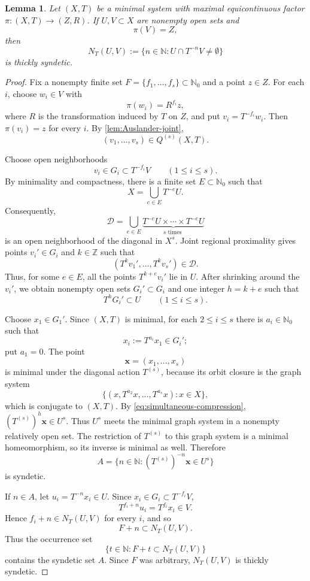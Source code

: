 \documentclass[reqno,12pt]{amsart}
\newtheorem{lemma}[thm]{Lemma}
\newcommand{\Nzero}{\mathbb N_0}
\def \N {\mathbb N}
\def \Z {\mathbb Z}
\numberwithin{equation}{section}
\begin{document}
\begin{lemma}\label{lem:full-fibre-returns}
Let $(X,T)$ be a minimal system with maximal equicontinuous
factor $\pi:(X,T)\to (Z,R)$. If $U,V\subset X$ are nonempty open sets and
\[
 \pi(V)=Z,
\]
then
\[
 N_T(U,V):=\{n\in\N:U\cap T^{-n}V\neq\emptyset\}
\]
is thickly syndetic.
\end{lemma}

\begin{proof}
Fix a nonempty finite set
$F=\{f_1,\ldots,f_s\}\subset\Nzero$ and a point $z\in Z$.
For each $i$, choose $w_i\in V$ with
\[
 \pi(w_i)=R^{f_i}z,
\]
where $R$ is the transformation induced by $T$ on $Z$, and put
$v_i=T^{-f_i}w_i$. Then $\pi(v_i)=z$ for every $i$.
By \cref{lem:Auslander-joint},
\[
 (v_1,\ldots,v_s)\in Q^{(s)}(X,T).
\]

Choose open neighborhoods
\[
 v_i\in G_i\subset T^{-f_i}V\qquad(1\leq i\leq s).
\]
By minimality and compactness, there is a finite set $E\subset\Nzero$ such
that
\[
 X=\bigcup_{e\in E}T^{-e}U.
\]
Consequently,
\[
 \mathcal D=\bigcup_{e\in E}\underbrace{T^{-e}U\times\cdots\times T^{-e}U}_{s\text{ times }}
\]
is an open neighborhood of the diagonal in $X^s$. Joint regional
proximality gives points $v_i'\in G_i$ and $k\in\Z$ such that
\[
 (T^kv_1',\ldots,T^kv_s')\in\mathcal D.
\]
Thus, for some $e\in E$, all the points $T^{k+e}v_i'$ lie in $U$.
After shrinking around the $v_i'$, we obtain nonempty open sets
$G_i'\subset G_i$ and one integer $h=k+e$ such that
\begin{equation}\label{eq:simultaneous-compression}
 T^hG_i'\subset U\qquad(1\leq i\leq s).
\end{equation}

Choose $x_1\in G_1'$. Since $(X,T)$ is minimal, for each $2\leq i\leq s$
there is $a_i\in\Nzero$ such that
\[
 x_i:=T^{a_i}x_1\in G_i';
\]
put $a_1=0$. The point
\[
 \mathbf x=(x_1,\ldots,x_s)
\]
is minimal under the diagonal action $T^{(s)}$, because its orbit closure
is the graph system
\[
 \{(x,T^{a_2}x,\ldots,T^{a_s}x):x\in X\},
\]
which is conjugate to $(X,T)$. By
\eqref{eq:simultaneous-compression}, $(T^{(s)})^h\mathbf x\in U^s$.
Thus $U^s$ meets the minimal graph system in a nonempty relatively open
set. The restriction of $T^{(s)}$ to this graph system is a minimal
homeomorphism, so its inverse is minimal as well. Therefore
\[
 A=\{n\in\N:(T^{(s)})^{-n}\mathbf x\in U^s\}
\]
is syndetic.

If $n\in A$, let $u_i=T^{-n}x_i\in U$. Since
$x_i\in G_i\subset T^{-f_i}V$,
\[
 T^{f_i+n}u_i=T^{f_i}x_i\in V.
\]
Hence $f_i+n\in N_T(U,V)$ for every $i$, and so
\[
 F+n\subset N_T(U,V).
\]
Thus the occurrence set
\[
 \{t\in\N:F+t\subset N_T(U,V)\}
\]
contains the syndetic set $A$. Since $F$ was arbitrary,
$N_T(U,V)$ is thickly syndetic.
\end{proof}
\end{document}
